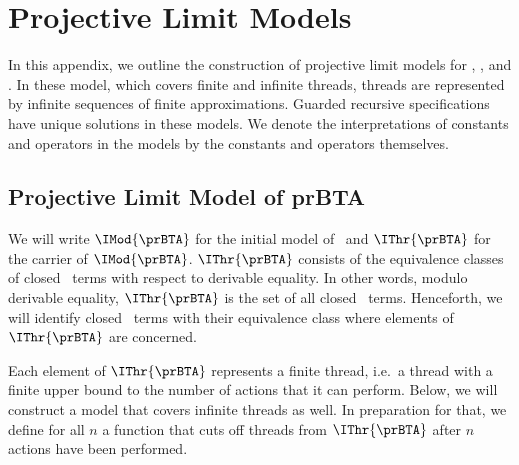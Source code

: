 \documentclass{llncs}
\begin{document}
\appendix

\section{Projective Limit Models}
\label{appendix}

In this appendix, we outline the construction of projective limit models 
for \prBTA, \prTSI, and \prTA.
In these model, which covers finite and infinite threads, threads are
represented by infinite sequences of finite approximations.
Guarded recursive specifications have unique solutions in these models.
We denote the interpretations of constants and operators in the models 
by the constants and operators themselves.

\subsection{Projective Limit Model of prBTA}
\label{app-prBTA}

We will write $\IMod{\prBTA}$ for the initial model of \prBTA\ and 
$\IThr{\prBTA}$ for the carrier of $\IMod{\prBTA}$.
$\IThr{\prBTA}$ consists of the equivalence classes of closed \prBTA\ 
terms with respect to derivable equality.
In other words, modulo derivable equality, $\IThr{\prBTA}$ is the set of
all closed \prBTA\ terms.
Henceforth, we will identify closed \prBTA\ terms with their equivalence
class where elements of $\IThr{\prBTA}$ are concerned.

Each element of $\IThr{\prBTA}$ represents a finite thread,  i.e.\ a
thread with a finite upper bound to the number of actions that it can
perform.
Below, we will construct a model that covers infinite threads as well.
In preparation for that, we define for all $n$ a function that cuts off
threads from $\IThr{\prBTA}$ after $n$ actions have been performed.
\end{document}
